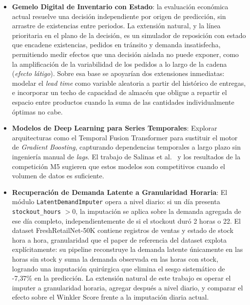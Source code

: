 \begin{itemize}
    \item \textbf{Gemelo Digital de Inventario con Estado}: la evaluación económica actual
    resuelve una decisión independiente por origen de predicción, sin arrastre de existencias
    entre periodos. La extensión natural, y la línea prioritaria en el plano de la decisión, es un
    simulador de reposición con estado que encadene existencias, pedidos en tránsito y demanda
    insatisfecha, permitiendo medir efectos que una decisión aislada no puede exponer, como la
    amplificación de la variabilidad de los pedidos a lo largo de la cadena (\textit{efecto
    látigo}). Sobre esa base se apoyarían dos extensiones inmediatas: modelar el \textit{lead
    time} como variable aleatoria a partir del histórico de entregas, e incorporar un techo de
    capacidad de almacén que obligue a repartir el espacio entre productos cuando la suma de las
    cantidades individualmente óptimas no cabe.

    \item \textbf{Modelos de Deep Learning para Series Temporales}: Explorar arquitecturas como el
    Temporal Fusion Transformer para sustituir el motor de \textit{Gradient Boosting}, capturando
    dependencias temporales a largo plazo sin ingeniería manual de \textit{lags}. El trabajo
    de Salinas et al.\ \cite{salinas2020deepar} y los resultados de la competición M5
    \cite{makridakis2022m5} sugieren que estos modelos son competitivos cuando el volumen de
    datos es suficiente.

    \item \textbf{Recuperación de Demanda Latente a Granularidad Horaria}: El módulo
    \texttt{Latent}\allowbreak\texttt{Demand}\allowbreak\texttt{Imputer} opera a nivel diario: si un día presenta \texttt{stockout\_hours} $>
    0$, la imputación se aplica sobre la demanda agregada de ese día completo, independientemente de
    si el stockout duró 2 horas o 22. El dataset FreshRetailNet-50K contiene registros de ventas y
    estado de stock hora a hora, granularidad que el paper de referencia del dataset
    \cite{freshretailnet2025} explota explícitamente: su pipeline reconstruye la demanda latente
    únicamente en las horas sin stock y suma la demanda observada en las horas con stock, logrando
    una imputación quirúrgica que elimina el sesgo sistemático de -7{,}37\% en la predicción. La
    extensión natural de este trabajo es operar el imputer a granularidad horaria, agregar después a
    nivel diario, y comparar el efecto sobre el Winkler Score frente a la imputación diaria actual.


\end{itemize}
